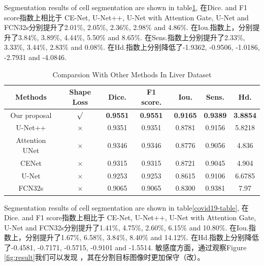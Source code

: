 \documentclass[UTF8]{article} %
\begin{document}
Segmentation results of cell segmentation are shown in table\ref{liver-table}, 在Dice. and F1 score指数上相比于
CE-Net, U-Net++, U-Net with Attention Gate, U-Net and FCN32s分别提升了2.01\%, 2.05\%, 2.36\%, 2.98\% and 4.86\%.
在Iou.指数上，分别提升了3.84\%, 3.89\%, 4.44\%, 5.50\% and 8.65\%. 在Sens.指数上分别提升了2.33\%, 3.33\%, 3.44\%, 
2.83\% and 0.08\%. 在Hd.指数上分别降低了-1.9362, -0.9506, -1.0186, -2.7931 and -4.0846.
  \begin{table}[H]
    \vspace{-2mm}
    \begin{center}\small
    \label{liver-table}
    \begin{tabular}{ccccccc}
      
    \toprule
    Methods & Shape Loss & Dice. & F1 score. & Iou. & Sens. & Hd.\\
    \midrule
     Our proposal & $\surd$ & \textbf{0.9551} & \textbf{0.9551} & \textbf{0.9165} & \textbf{0.9389} & \textbf{3.8854}\\
     U-Net++ & $\times$ & 0.9351 & 0.9351 & 0.8781 & 0.9156 & 5.8218\\
     Attention UNet & $\times$ & 0.9346 & 0.9346 & 0.8776 & 0.9056 & 4.836\\
     CENet & $\times$ & 0.9315 & 0.9315 & 0.8721 & 0.9045 & 4.904\\
     U-Net & $\times$ & 0.9253 & 0.9253 & 0.8615 & 0.9106 & 6.6785\\
     FCN32s & $\times$ & 0.9065 & 0.9065 & 0.8300 & 0.9381 & 7.97\\
  \bottomrule    
    \end{tabular}
    \caption{Comparsion With Other Methods In Liver\cite{liver} Dataset}
  \end{center}
    \vspace{-4mm}
  \end{table}

  Segmentation results of cell segmentation are shown in table\ref{covid19-table}, 在Dice. and F1 score指数上相比于
  CE-Net, U-Net++, U-Net with Attention Gate, U-Net and FCN32s分别提升了1.41\%, 4.75\%, 2.60\%, 6.15\% and 10.80\%.
  在Iou.指数上，分别提升了1.67\%, 6.58\%, 3.84\%, 8.40\% and 14.12\%. %
  在Hd.指数上分别降低了-0.4581, -0.7171, -0.5715, -0.9101 and -1.5514. 敏感度方面，通过观察Figure \ref{fig:result}我们可以发现
  ，其在分割目标图像时更加保守（改）。
\end{document}
